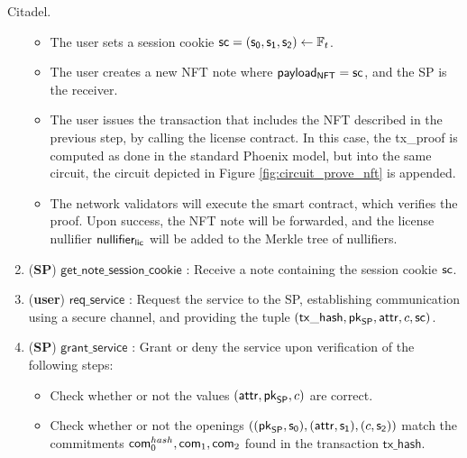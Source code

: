 \begin{protocol}{Citadel.}
\begin{enumerate}
		\begin{itemize}
			\item The user sets a session cookie $\mathsf{sc} = (\mathsf{s_0}, \mathsf{s_1}, \mathsf{s_2}) \leftarrow \mathbb{F}_t$.
			\item The user creates a new NFT note where $\mathsf{payload_{NFT}} = \mathsf{sc}$, and the SP is the receiver.
			\item The user issues the transaction that includes the NFT described in the previous step, by calling the license contract. In this case, the \textsf{tx\_proof} is computed as done in the standard Phoenix model, but into the same circuit, the circuit depicted in Figure \ref{fig:circuit_prove_nft} is appended.
			\item The network validators will execute the smart contract, which verifies the proof. Upon success, the NFT note will be forwarded, and the license nullifier $\mathsf{nullifier_{lic}}$ will be added to the Merkle tree of nullifiers.
		\end{itemize}

		\item (\textbf{SP}) $\mathsf{get\_note\_session\_cookie}$ : Receive a note containing the session cookie $\mathsf{sc}$.

		\item (\textbf{user}) $\mathsf{req\_service}$ : Request the service to the SP, establishing communication using a secure channel, and providing the tuple $(\mathsf{tx\_hash}, \mathsf{pk}_{\mathsf{SP}}, \mathsf{attr}, c, \mathsf{sc})$.

		\item (\textbf{SP}) $\mathsf{grant\_service}$ : Grant or deny the service upon verification of the following steps:

		\begin{itemize}
			\item Check whether or not the values $(\mathsf{attr}, \mathsf{pk}_{\mathsf{SP}}, c)$ are correct.
			\item Check whether or not the openings $((\mathsf{pk}_{\mathsf{SP}}, \mathsf{s_0}), (\mathsf{attr}, \mathsf{s_1}), (c, \mathsf{s_2}))$ match the commitments $\mathsf{com}_0^{hash}, \mathsf{com}_1, \mathsf{com}_2$ found in the transaction $\mathsf{tx\_hash}$.
		\end{itemize}

	\end{enumerate}
\end{protocol}

